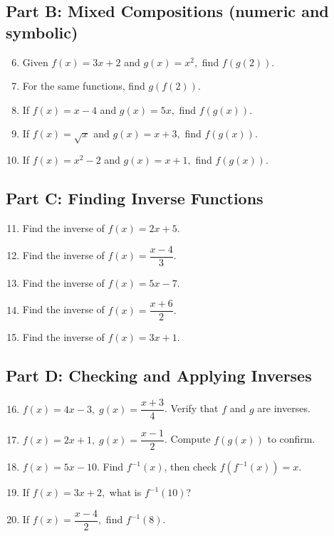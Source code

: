 \documentclass[12pt]{article}
\begin{document}
\subsection*{Part B: Mixed Compositions (numeric and symbolic)}
\begin{enumerate}
  \setcounter{enumi}{5}
  \item Given \(f(x) = 3x + 2\) and \(g(x) = x^2,\) find \(f(g(2))\).
  \item For the same functions, find \(g(f(2))\).
  \item If \(f(x) = x - 4\) and \(g(x) = 5x,\) find \(f(g(x))\).
  \item If \(f(x) = \sqrt{x}\) and \(g(x) = x + 3,\) find \(f(g(x))\).
  \item If \(f(x) = x^2 - 2\) and \(g(x) = x + 1,\) find \(f(g(x))\).
\end{enumerate}

\subsection*{Part C: Finding Inverse Functions}
\begin{enumerate}
  \setcounter{enumi}{10}
  \item Find the inverse of \(f(x) = 2x + 5.\)
  \item Find the inverse of \(f(x) = \dfrac{x - 4}{3}.\)
  \item Find the inverse of \(f(x) = 5x - 7.\)
  \item Find the inverse of \(f(x) = \dfrac{x + 6}{2}.\)
  \item Find the inverse of \(f(x) = 3x + 1.\)
\end{enumerate}

\subsection*{Part D: Checking and Applying Inverses}
\begin{enumerate}
  \setcounter{enumi}{15}
  \item \(f(x) = 4x - 3,\; g(x) = \dfrac{x + 3}{4}\). Verify that \(f\) and \(g\) are inverses.
  \item \(f(x) = 2x + 1,\; g(x) = \dfrac{x - 1}{2}\). Compute \(f(g(x))\) to confirm.
  \item \(f(x) = 5x - 10.\) Find \(f^{-1}(x)\), then check \(f(f^{-1}(x)) = x.\)
  \item If \(f(x) = 3x + 2,\) what is \(f^{-1}(10)\)?
  \item If \(f(x) = \dfrac{x - 4}{2},\) find \(f^{-1}(8)\).
\end{enumerate}
\end{document}
